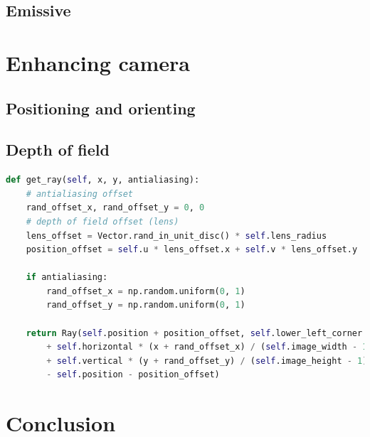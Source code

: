 \documentclass[]{article}
\begin{document}
		
		\subsection{Emissive}
	\section{Enhancing camera}
		\subsection{Positioning and orienting}
		\subsection{Depth of field}
		\label{sec:depthoffield}
		\begin{lstlisting}[caption={Method to generate a ray for given pixel coordinates using antialisaing and thin lens approximation}, language=Python, label=lst:getray]
def get_ray(self, x, y, antialiasing):
	# antialiasing offset
	rand_offset_x, rand_offset_y = 0, 0
	# depth of field offset (lens)
	lens_offset = Vector.rand_in_unit_disc() * self.lens_radius
	position_offset = self.u * lens_offset.x + self.v * lens_offset.y
	
	if antialiasing:
		rand_offset_x = np.random.uniform(0, 1)
		rand_offset_y = np.random.uniform(0, 1)
	
	return Ray(self.position + position_offset, self.lower_left_corner 
		+ self.horizontal * (x + rand_offset_x) / (self.image_width - 1) 
		+ self.vertical * (y + rand_offset_y) / (self.image_height - 1) 
		- self.position - position_offset)
		\end{lstlisting}
	
	\section{Conclusion}
	
	\clearpage
	\printbibheading
	\printbibliography
		
\end{document}
